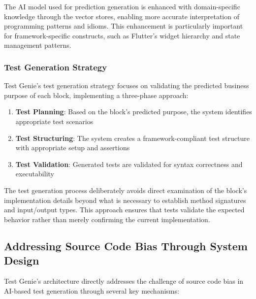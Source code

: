 \hspace{0.5cm}The AI model used for prediction generation is enhanced with domain-specific knowledge through the vector stores, enabling more accurate interpretation of programming patterns and idioms. This enhancement is particularly important for framework-specific constructs, such as Flutter's widget hierarchy and state management patterns.

\subsubsection{Test Generation Strategy}

\hspace{0.5cm}Test Genie's test generation strategy focuses on validating the predicted business purpose of each block, implementing a three-phase approach:

\begin{enumerate}
    \item \textbf{Test Planning}: Based on the block's predicted purpose, the system identifies appropriate test scenarios
    \item \textbf{Test Structuring}: The system creates a framework-compliant test structure with appropriate setup and assertions
    \item \textbf{Test Validation}: Generated tests are validated for syntax correctness and executability
\end{enumerate}

\hspace{0.5cm}The test generation process deliberately avoids direct examination of the block's implementation details beyond what is necessary to establish method signatures and input/output types. This approach ensures that tests validate the expected behavior rather than merely confirming the current implementation.

\subsection{Addressing Source Code Bias Through System Design}

\hspace{0.5cm}Test Genie's architecture directly addresses the challenge of source code bias in AI-based test generation through several key mechanisms:

